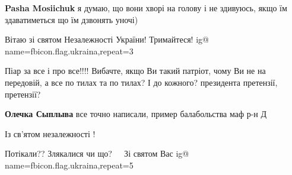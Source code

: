 \begin{itemize}
\begin{itemize}
\textbf{Pasha Mosiichuk} я думаю, що вони хворі на голову і не здивуюсь, якщо їм здаватиметься що їм дзвонять уночі)
\end{itemize}

 
Вітаю зі святом Незалежності України! Тримайтеся! 
\ifcmt
  ig@ name=fbicon.flag.ukraina,repeat=3
\fi


 

Піар за все і про все!!!! Вибачте, якщо Ви такий патріот, чому Ви не на
передовій, а все по тилах та по тилах? І до кожного? президента
претензії, претензії?

\begin{itemize}
 
\textbf{Олечка Сыплыва} все точно написали, пример балабольства маф р-н Д
\end{itemize}

 
Із св'ятом незалежності !

 
Потікали?? Злякалися чи що?🤣🤣🤣🤣 
Зі святом Вас
\ifcmt
  ig@ name=fbicon.flag.ukraina,repeat=5
\fi

 

\end{itemize}
